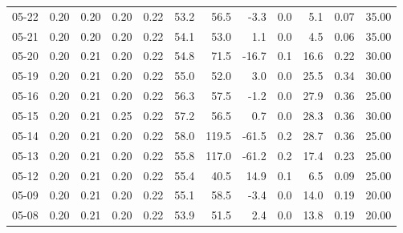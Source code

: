 \begin{threeparttable}
{\begin{tabular}{lrrrrrrrrrrr}
  05-22 &          0.20 &          0.20 &          0.20 &        0.22 &                53.2 &                56.5 &       -3.3 &                 0.0 &              5.1 &            0.07 &                  35.00 \\
  05-21 &          0.20 &          0.20 &          0.20 &        0.22 &                54.1 &                53.0 &        1.1 &                 0.0 &              4.5 &            0.06 &                  35.00 \\
  05-20 &          0.20 &          0.21 &          0.20 &        0.22 &                54.8 &                71.5 &      -16.7 &                 0.1 &             16.6 &            0.22 &                  30.00 \\
  05-19 &          0.20 &          0.21 &          0.20 &        0.22 &                55.0 &                52.0 &        3.0 &                 0.0 &             25.5 &            0.34 &                  30.00 \\
  05-16 &          0.20 &          0.21 &          0.20 &        0.22 &                56.3 &                57.5 &       -1.2 &                 0.0 &             27.9 &            0.36 &                  25.00 \\
  05-15 &          0.20 &          0.21 &          0.25 &        0.22 &                57.2 &                56.5 &        0.7 &                 0.0 &             28.3 &            0.36 &                  30.00 \\
  05-14 &          0.20 &          0.21 &          0.20 &        0.22 &                58.0 &               119.5 &      -61.5 &                 0.2 &             28.7 &            0.36 &                  25.00 \\
  05-13 &          0.20 &          0.21 &          0.20 &        0.22 &                55.8 &               117.0 &      -61.2 &                 0.2 &             17.4 &            0.23 &                  25.00 \\
  05-12 &          0.20 &          0.21 &          0.20 &        0.22 &                55.4 &                40.5 &       14.9 &                 0.1 &              6.5 &            0.09 &                  25.00 \\
  05-09 &          0.20 &          0.21 &          0.20 &        0.22 &                55.1 &                58.5 &       -3.4 &                 0.0 &             14.0 &            0.19 &                  20.00 \\
  05-08 &          0.20 &          0.21 &          0.20 &        0.22 &                53.9 &                51.5 &        2.4 &                 0.0 &             13.8 &            0.19 &                  20.00 \\

\end{tabular}}
\end{threeparttable}
